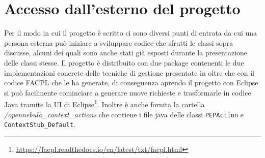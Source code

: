 \section{Accesso dall'esterno del progetto}
Per il modo in cui il progetto è scritto ci sono diversi punti di entrata da cui una persona esterna può iniziare a sviluppare codice che sfrutti le classi sopra discusse, alcuni dei quali sono anche stati già esposti durante la presentazione delle classi stesse. Il progetto è distribuito con due package contenenti le due implementazioni concrete delle tecniche di gestione presentate in \cite{10.1007/978-3-319-08260-8_6} oltre che con il codice FACPL che le ha generate, di conseguenza aprendo il progetto con Eclipse si può facilmente cominciare a generare nuove richieste e trasformarle in codice Java tramite la UI di Eclipse\footnote{\url{https://facpl.readthedocs.io/en/latest/txt/facpl.html}}. Inoltre è anche fornita la cartella \emph{/opennebula\_context\_actions} che contiene i file java delle classi \texttt{PEPAction} e \texttt{ContextStub\_Default}.\par

